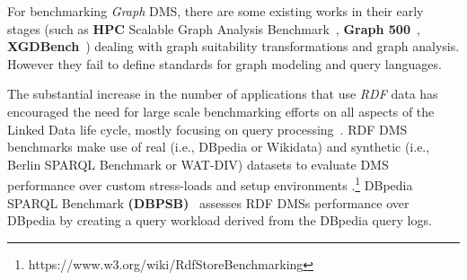 \documentclass{llncs}
\begin{document}
    For benchmarking \textit{Graph} DMS, there are some existing works in their early stages (such as \textbf{HPC} Scalable Graph Analysis Benchmark~\cite{Dominguez-Sal:2010:SGD:1927585.1927590}, \textbf{Graph 500}~\cite{murphy2010introducing}, \textbf{XGDBench}~\cite{conf/cloudcom/DayarathnaS12}) dealing with 
    graph suitability transformations and graph analysis.
    However they fail to define standards for graph modeling and query languages.
    
    The substantial increase in the number of applications that use \textit{RDF} data has encouraged the need for large scale benchmarking efforts on all aspects of the Linked Data life cycle, mostly focusing on query processing~\cite{ngomo2016hobbit}.
    RDF DMS benchmarks make use of real (i.e., DBpedia or Wikidata) and synthetic (i.e., Berlin SPARQL Benchmark or WAT-DIV) datasets to evaluate DMS performance over custom stress-loads and setup environments \cite{fineeval}.\footnote{https://www.w3.org/wiki/RdfStoreBenchmarking}
    DBpedia SPARQL Benchmark \textbf{(DBPSB)}~\cite{Morsey2011} assesses RDF DMSs performance over DBpedia by creating a query workload derived from the DBpedia query logs. 
    
\end{document}
